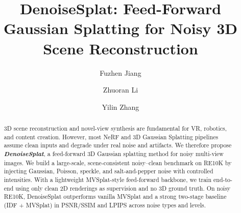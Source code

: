 \documentclass[sigconf]{acmart}
\begin{document}
\fancyhead{}  %
\title{DenoiseSplat: Feed-Forward Gaussian Splatting for Noisy 3D Scene Reconstruction}

\author{Fuzhen Jiang}





\author{Zhuoran Li}

\author{Yilin Zhang}


\renewcommand{\shortauthors}{Trovato et al.}




\begin{abstract}
3D scene reconstruction and novel-view synthesis are fundamental for VR, robotics, and content creation.
However, most NeRF and 3D Gaussian Splatting pipelines assume clean inputs and degrade under real noise and artifacts.
We therefore propose \textbf{\emph{DenoiseSplat}}, a feed-forward 3D Gaussian splatting method for noisy multi-view images.
We build a large-scale, scene-consistent noisy--clean benchmark on RE10K by injecting Gaussian, Poisson, speckle, and salt-and-pepper noise with controlled intensities.
With a lightweight MVSplat-style feed-forward backbone, we train end-to-end using only clean 2D renderings as supervision and no 3D ground truth.
On noisy RE10K, DenoiseSplat outperforms vanilla MVSplat and a strong two-stage baseline (IDF + MVSplat) in PSNR/SSIM and LPIPS across noise types and levels.
\end{abstract}
\end{document}
